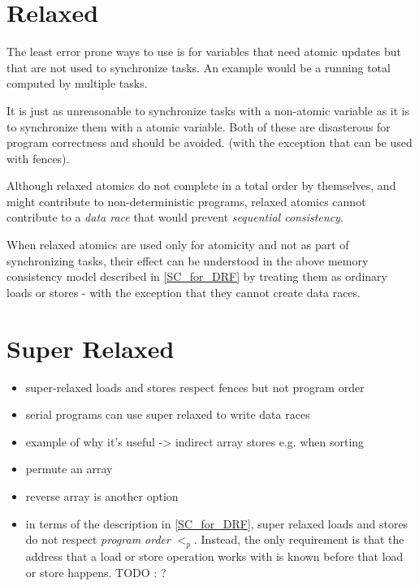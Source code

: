 \section{Relaxed}

The least error prone ways to use  is for
variables that need atomic updates but that are not used to synchronize
tasks. An example would be a running total computed by multiple tasks.

It is just as unreasonable to synchronize tasks with a non-atomic variable
as it is to synchronize them with a  atomic
variable. Both of these are disasterous for program correctness and should
be avoided. (with the exception that  can
be used with fences).

Although relaxed atomics do not complete in a total order by themselves,
and might contribute to non-deterministic programs, relaxed atomics cannot
contribute to a \textit{data race} that would prevent \textit{sequential
consistency}.

When relaxed atomics are used only for atomicity and not as part of
synchronizing tasks, their effect can be understood in the above memory
consistency model described in \ref{SC_for_DRF} by treating them as ordinary
loads or stores - with the exception that they cannot create data races.

\section{Super Relaxed}

\begin{itemize}

\item super-relaxed loads and stores respect fences but not program order

\item serial programs can use super relaxed to write data races

\item example of why it's useful -> indirect array stores e.g. when sorting

\item permute an array

\item reverse array is another option

\item in terms of the description in \ref{SC_for_DRF}, super relaxed loads and stores do not respect \textit{program order} $<_p$. Instead, the only requirement is that the address that a load or store operation works with is known before that load or store happens.  TODO : ?

\end{itemize}

